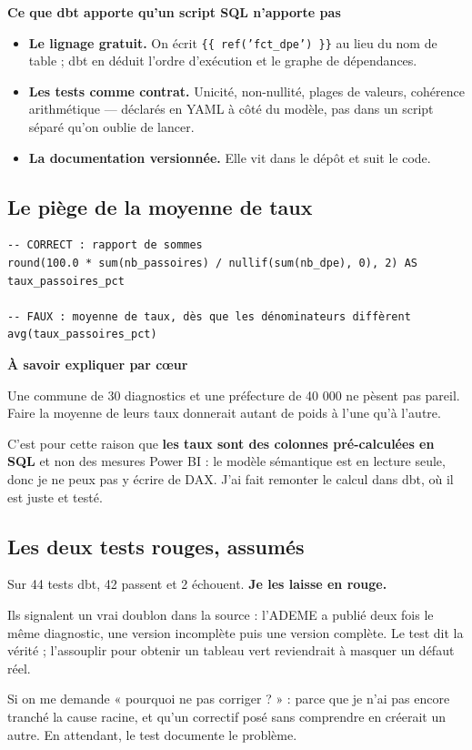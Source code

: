 \documentclass[11pt,a4paper]{article}
\newcommand{\cmd}[1]{\texttt{\small #1}}
\newcommand{\titrebloc}[1]{\textbf{\color{encre}#1}\par\vspace{0.25em}}
\begin{document}
\begin{pourquoi}
\titrebloc{Ce que dbt apporte qu'un script SQL n'apporte pas}
\begin{itemize}
  \item \textbf{Le lignage gratuit.} On écrit \cmd{\{\{ ref('fct\_dpe') \}\}}
        au lieu du nom de table ; dbt en déduit l'ordre d'exécution et le
        graphe de dépendances.
  \item \textbf{Les tests comme contrat.} Unicité, non-nullité, plages de
        valeurs, cohérence arithmétique — déclarés en YAML à côté du modèle,
        pas dans un script séparé qu'on oublie de lancer.
  \item \textbf{La documentation versionnée.} Elle vit dans le dépôt et suit
        le code.
\end{itemize}
\end{pourquoi}

\subsection{Le piège de la moyenne de taux}

\begin{lstlisting}[style=sql]
-- CORRECT : rapport de sommes
round(100.0 * sum(nb_passoires) / nullif(sum(nb_dpe), 0), 2) AS taux_passoires_pct

-- FAUX : moyenne de taux, dès que les dénominateurs diffèrent
avg(taux_passoires_pct)
\end{lstlisting}

\begin{attention}
\titrebloc{À savoir expliquer par cœur}
Une commune de 30 diagnostics et une préfecture de 40 000 ne pèsent pas
pareil. Faire la moyenne de leurs taux donnerait autant de poids à l'une
qu'à l'autre.

C'est pour cette raison que \textbf{les taux sont des colonnes pré-calculées
en SQL} et non des mesures Power BI : le modèle sémantique est en lecture
seule, donc je ne peux pas y écrire de DAX. J'ai fait remonter le calcul dans
dbt, où il est juste et testé.
\end{attention}

\subsection{Les deux tests rouges, assumés}

\begin{pourquoi}
Sur 44 tests dbt, 42 passent et 2 échouent. \textbf{Je les laisse en rouge.}

Ils signalent un vrai doublon dans la source : l'ADEME a publié deux fois le
même diagnostic, une version incomplète puis une version complète. Le test dit
la vérité ; l'assouplir pour obtenir un tableau vert reviendrait à masquer un
défaut réel.

Si on me demande « pourquoi ne pas corriger ? » : parce que je n'ai pas encore
tranché la cause racine, et qu'un correctif posé sans comprendre en
créerait un autre. En attendant, le test documente le problème.
\end{pourquoi}
\end{document}
